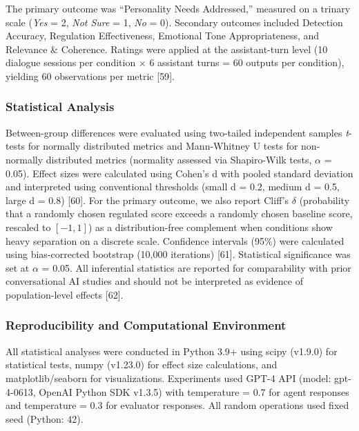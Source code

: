 The primary outcome was ``Personality Needs Addressed,'' measured on a trinary scale (\textit{Yes} = 2, \textit{Not Sure} = 1, \textit{No} = 0). Secondary outcomes included Detection Accuracy, Regulation Effectiveness, Emotional Tone Appropriateness, and Relevance \& Coherence. Ratings were applied at the assistant-turn level (10 dialogue sessions per condition $\times$ 6 assistant turns = 60 outputs per condition), yielding 60 observations per metric {[}59{]}.

\subsubsection{Statistical Analysis}\label{statistical-analysis}

Between-group differences were evaluated using two-tailed independent samples \textit{t}-tests for normally distributed metrics and Mann-Whitney U tests for non-normally distributed metrics (normality assessed via Shapiro-Wilk tests, $\alpha$ = 0.05). Effect sizes were calculated using Cohen's d with pooled standard deviation and interpreted using conventional thresholds (small d = 0.2, medium d = 0.5, large d = 0.8) {[}60{]}. For the primary outcome, we also report Cliff's \(\delta\) (probability that a randomly chosen regulated score exceeds a randomly chosen baseline score, rescaled to \([-1,1]\)) as a distribution-free complement when conditions show heavy separation on a discrete scale. Confidence intervals (95\%) were calculated using bias-corrected bootstrap (10,000 iterations) {[}61{]}. Statistical significance was set at $\alpha$ = 0.05. All inferential statistics are reported for comparability with prior conversational AI studies and should not be interpreted as evidence of population-level effects {[}62{]}.

\subsubsection{Reproducibility and Computational Environment}\label{reproducibility-and-computational-environment}

All statistical analyses were conducted in Python 3.9+ using scipy (v1.9.0) for statistical tests, numpy (v1.23.0) for effect size calculations, and matplotlib/seaborn for visualizations. Experiments used GPT-4 API (model: gpt-4-0613, OpenAI Python SDK v1.3.5) with temperature = 0.7 for agent responses and temperature = 0.3 for evaluator responses. All random operations used fixed seed (Python: 42).

